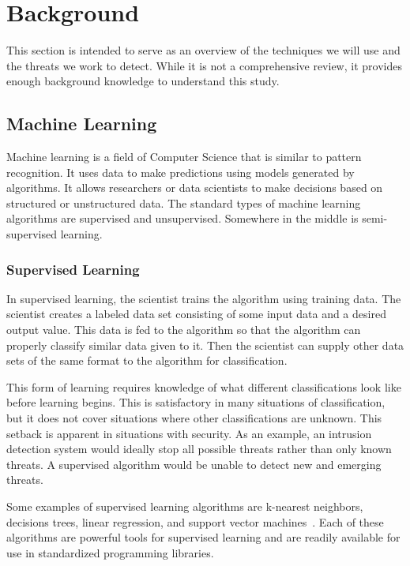 \section{Background}

This section is intended to serve as an overview of the techniques we will use and the threats
we work to detect.
While it is not a comprehensive review, it provides enough background knowledge to understand this
study.

\subsection{Machine Learning}

Machine learning is a field of Computer Science that is similar to pattern recognition.
It uses data to make predictions using models generated by algorithms.
It allows researchers or data scientists to make decisions based on structured or unstructured data.
The standard types of machine learning algorithms are supervised and unsupervised.
Somewhere in the middle is semi-supervised learning.

\subsubsection{Supervised Learning}

In supervised learning, the scientist trains the algorithm using training data.
The scientist creates a labeled data set consisting of some input data and a desired output value.
This data is fed to the algorithm so that the algorithm can properly classify similar data given
to it.
Then the scientist can supply other data sets of the same format to the algorithm for classification.

This form of learning requires knowledge of what different classifications look like before learning
begins.
This is satisfactory in many situations of classification, but it does not cover situations where
other classifications are unknown.
This setback is apparent in situations with security.
As an example, an intrusion detection system would ideally stop all possible threats rather than
only known threats.
A supervised algorithm would be unable to detect new and emerging threats.

Some examples of supervised learning algorithms are k-nearest neighbors, decisions trees, linear
regression, and support vector machines~\cite{scisuper}.
Each of these algorithms are powerful tools for supervised learning and are readily available
for use in standardized programming libraries.

